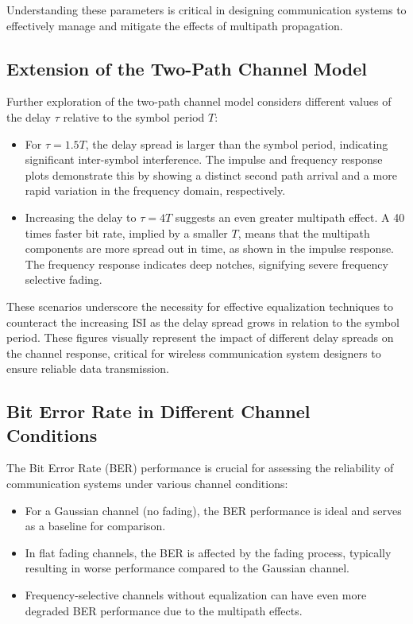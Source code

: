 Understanding these parameters is critical in designing communication systems to effectively manage and mitigate the effects of multipath propagation.


\subsection*{Extension of the Two-Path Channel Model}

Further exploration of the two-path channel model considers different values of the delay \(\tau\) relative to the symbol period \(T\):

\begin{itemize}
    \item For \(\tau = 1.5T\), the delay spread is larger than the symbol period, indicating significant inter-symbol interference. The impulse and frequency response plots demonstrate this by showing a distinct second path arrival and a more rapid variation in the frequency domain, respectively.
    \item Increasing the delay to \(\tau = 4T\) suggests an even greater multipath effect. A 40 times faster bit rate, implied by a smaller \(T\), means that the multipath components are more spread out in time, as shown in the impulse response. The frequency response indicates deep notches, signifying severe frequency selective fading.
\end{itemize}

These scenarios underscore the necessity for effective equalization techniques to counteract the increasing ISI as the delay spread grows in relation to the symbol period.
These figures visually represent the impact of different delay spreads on the channel response, critical for wireless communication system designers to ensure reliable data transmission.


\subsection*{Bit Error Rate in Different Channel Conditions}

The Bit Error Rate (BER) performance is crucial for assessing the reliability of communication systems under various channel conditions:

\begin{itemize}
    \item For a Gaussian channel (no fading), the BER performance is ideal and serves as a baseline for comparison.
    \item In flat fading channels, the BER is affected by the fading process, typically resulting in worse performance compared to the Gaussian channel.
    \item Frequency-selective channels without equalization can have even more degraded BER performance due to the multipath effects.
\end{itemize}


